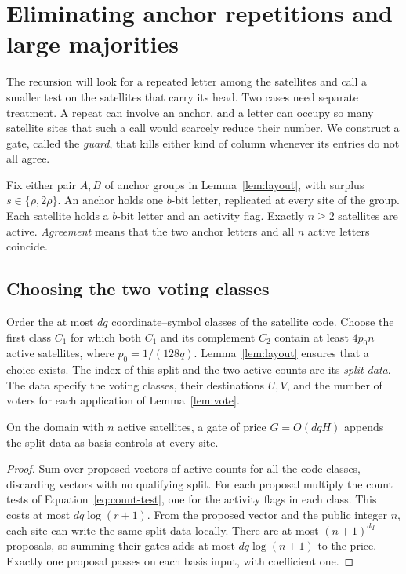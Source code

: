 \section{Eliminating anchor repetitions and large majorities}\label{sec:guard}

The recursion will look for a repeated letter among the satellites and
call a smaller test on the satellites that carry its head. Two cases
need separate treatment. A repeat can involve an anchor, and a letter
can occupy so many satellite sites that such a call would scarcely
reduce their number. We construct a gate, called the \emph{guard}, that
kills either kind of column whenever its entries do not all agree.

Fix either pair \(A,B\) of anchor groups in Lemma~\ref{lem:layout}, with
surplus \(s\in\{\rho,2\rho\}\). An anchor holds one \(b\)-bit letter,
replicated at every site of the group. Each satellite holds a \(b\)-bit
letter and an activity flag. Exactly \(n\ge2\) satellites are active.
\emph{Agreement} means that the two anchor letters and all \(n\)
active letters coincide.

\subsection{Choosing the two voting classes}

Order the at most \(dq\) coordinate--symbol classes of the satellite
code. Choose the first class \(C_1\) for which both \(C_1\) and its
complement \(C_2\) contain at least \(4p_0n\) active satellites, where
\(p_0=1/(128q)\). Lemma~\ref{lem:layout} ensures that a choice exists.
The index of this split and the two active counts are its \emph{split
data}. The data specify the voting classes, their destinations \(U,V\),
and the number of voters for each application of Lemma~\ref{lem:vote}.

\begin{lemma}\label{lem:splitdata}
On the domain with \(n\) active satellites, a gate of price
\(G=O(dqH)\) appends the split data as basis controls at every site.
\end{lemma}
\begin{proof}
Sum over proposed vectors of active counts for all the code classes,
discarding vectors with no qualifying split. For each proposal
multiply the count tests of Equation~\eqref{eq:count-test}, one for
the activity flags in each class. This costs at most \(dq\log(r+1)\).
From the proposed vector and the public integer \(n\), each site
can write the same split data locally. There are at most
\((n+1)^{dq}\) proposals, so summing their gates adds at most
\(dq\log(n+1)\) to the price. Exactly one proposal passes on each
basis input, with coefficient one.
\end{proof}

